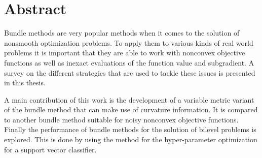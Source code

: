 \section*{Abstract}

Bundle methods are very popular methods when it comes to the solution of nonsmooth optimization problems. To apply them to various kinds of real world problems it is important that they are able to work with nonconvex objective functions as well as inexact evaluations of the function value and subgradient.
A survey on the different strategies that are used to tackle these issues is presented in this thesis.

A main contribution of this work is the development of a variable metric variant of the bundle method that can make use of curvature information.  
It is compared to another bundle method suitable for noisy nonconvex objective functions.
Finally the performance of bundle methods for the solution of bilevel problems is explored. This is done by using the method for the hyper-parameter optimization for a support vector classifier.



